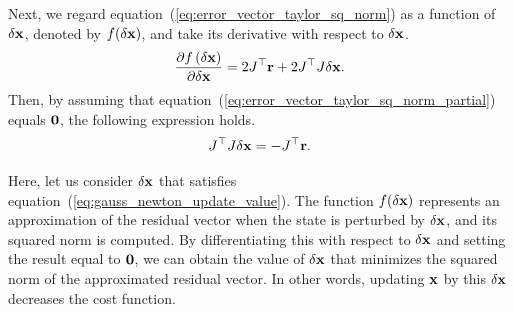 Next, we regard equation~(\ref{eq:error_vector_taylor_sq_norm}) as a function of $\delta {\bf x}$, denoted by $f(\delta {\bf x})$, and take its derivative with respect to $\delta {\bf x}$.
%
\begin{align}
  \frac{ \partial f \left( \delta {\bf x} \right) }{ \partial \delta {\bf x} } = 2 J^{\top} {\bf r} + 2 J^{\top} J \delta {\bf x}.
  \label{eq:error_vector_taylor_sq_norm_partial}
\end{align}
%
Then, by assuming that equation~(\ref{eq:error_vector_taylor_sq_norm_partial}) equals ${\bf 0}$, the following expression holds.
%
\begin{align}
  J^{\top} J \delta {\bf x} = -J^{\top} {\bf r}.
  \label{eq:gauss_newton_update_value}
\end{align}

Here, let us consider $\delta {\bf x}$ that satisfies equation~(\ref{eq:gauss_newton_update_value}).
The function $f(\delta {\bf x})$ represents an approximation of the residual vector when the state is perturbed by $\delta {\bf x}$, and its squared norm is computed.
By differentiating this with respect to $\delta {\bf x}$ and setting the result equal to ${\bf 0}$, we can obtain the value of $\delta {\bf x}$ that minimizes the squared norm of the approximated residual vector.
In other words, updating ${\bf x}$ by this $\delta {\bf x}$ decreases the cost function.

